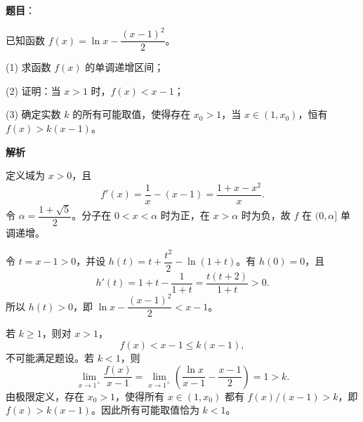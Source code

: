 \begin{answer}

\textbf{题目}：

已知函数 \(f(x)=\ln x-\dfrac{(x-1)^2}{2}\)。

(1) 求函数 \(f(x)\) 的单调递增区间；

(2) 证明：当 \(x>1\) 时，\(f(x)<x-1\)；

(3) 确定实数 \(k\) 的所有可能取值，使得存在 \(x_0>1\)，当 \(x\in(1,x_0)\)，恒有 \(f(x)>k(x-1)\)。

\textbf{解析}


定义域为 \(x>0\)，且
\nopagebreak[4]
\[
f'(x)=\frac1x-(x-1)=\frac{1+x-x^2}{x}.
\]
令 \(\alpha=\dfrac{1+\sqrt5}{2}\)。分子在 \(0<x<\alpha\) 时为正，在 \(x>\alpha\) 时为负，故 \(f\) 在 \((0,\alpha]\) 单调递增。


令 \(t=x-1>0\)，并设 \(h(t)=t+\dfrac{t^2}{2}-\ln(1+t)\)。有 \(h(0)=0\)，且
\nopagebreak[4]
\[
h'(t)=1+t-\frac1{1+t}=\frac{t(t+2)}{1+t}>0.
\]
所以 \(h(t)>0\)，即 \(\ln x-\dfrac{(x-1)^2}{2}<x-1\)。


若 \(k\geqslant1\)，则对 \(x>1\)，
\nopagebreak[4]
\[
f(x)<x-1\leqslant k(x-1),
\]
不可能满足题设。若 \(k<1\)，则
\nopagebreak[4]
\[
\lim_{x\to1^+}\frac{f(x)}{x-1}
=\lim_{x\to1^+}\left(\frac{\ln x}{x-1}-\frac{x-1}{2}\right)=1>k.
\]
由极限定义，存在 \(x_0>1\)，使得所有 \(x\in(1,x_0)\) 都有 \(f(x)/(x-1)>k\)，即 \(f(x)>k(x-1)\)。因此所有可能取值恰为 \(k<1\)。

\gkanswer{答案（1）：单调递增区间为 \(\left(0,\dfrac{1+\sqrt5}{2}\right]\)。}



\end{answer}